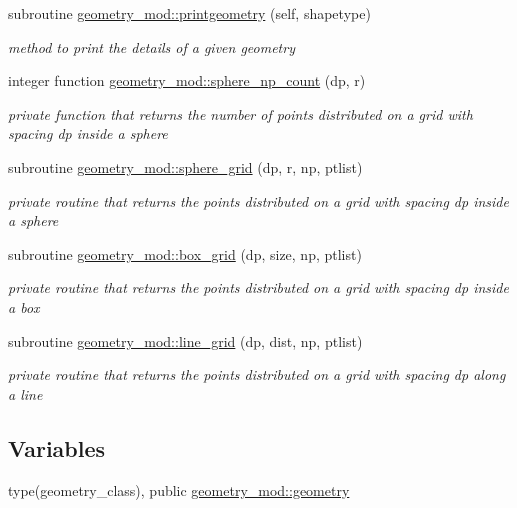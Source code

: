 \begin{DoxyCompactItemize}
subroutine \hyperlink{namespacegeometry__mod_aed4426181ca851b41717edd50268e5f3}{geometry\+\_\+mod\+::printgeometry} (self, shapetype)
\begin{DoxyCompactList}\small\item\em method to print the details of a given geometry \end{DoxyCompactList}\item 
integer function \hyperlink{namespacegeometry__mod_a05de7940b4e7df5a2b31f3d0414e3743}{geometry\+\_\+mod\+::sphere\+\_\+np\+\_\+count} (dp, r)
\begin{DoxyCompactList}\small\item\em private function that returns the number of points distributed on a grid with spacing dp inside a sphere \end{DoxyCompactList}\item 
subroutine \hyperlink{namespacegeometry__mod_a6c03a4ea3de6763940396dbeb3908ebc}{geometry\+\_\+mod\+::sphere\+\_\+grid} (dp, r, np, ptlist)
\begin{DoxyCompactList}\small\item\em private routine that returns the points distributed on a grid with spacing dp inside a sphere \end{DoxyCompactList}\item 
subroutine \hyperlink{namespacegeometry__mod_ae87e4ecff2d21a839da2b82919b5fd0b}{geometry\+\_\+mod\+::box\+\_\+grid} (dp, size, np, ptlist)
\begin{DoxyCompactList}\small\item\em private routine that returns the points distributed on a grid with spacing dp inside a box \end{DoxyCompactList}\item 
subroutine \hyperlink{namespacegeometry__mod_abcb09c0f5274c27cb79b0dd009ed94b3}{geometry\+\_\+mod\+::line\+\_\+grid} (dp, dist, np, ptlist)
\begin{DoxyCompactList}\small\item\em private routine that returns the points distributed on a grid with spacing dp along a line \end{DoxyCompactList}\end{DoxyCompactItemize}
\subsection*{Variables}
\begin{DoxyCompactItemize}
\item 
type(geometry\+\_\+class), public \hyperlink{namespacegeometry__mod_ad2ad4f7e1138beaad5f37d5c15b7b457}{geometry\+\_\+mod\+::geometry}
\end{DoxyCompactItemize}
